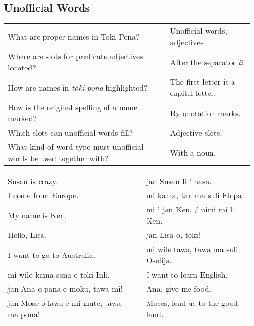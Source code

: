 \subsection*{Unofficial Words} 
\label{'unofficial_words'}
%
\begin{supertabular}{p{5,5cm}|ll}
What are proper names in Toki Pona? && Unofficial words, adjectives \\ %
Where are slots for predicate adjectives located? && After the separator \textit{li}. \\ %
How are names in \textit{toki pona} highlighted? && The first letter is a capital letter. \\ %
How is the original spelling of a name marked? && By quotation marks.  \\ %
Which slots can unofficial words fill? && Adjective slots.  \\ %
What kind of word type must unofficial words be used together with? && With a noun. \\ %
\end{supertabular}

\begin{supertabular}{p{5,5cm}|ll}
Susan is crazy.  && jan Susan li ' nasa. \\ %
I come from Europe. && mi kama, tan ma suli Elopa. \\ %
My name is Ken.  && mi ' jan Ken. / nimi mi li Ken. \\ %
Hello, Lisa.  && jan Lisa o, toki! \\ %
I want to go to Australia. && mi wile tawa, tawa ma suli Oselija. \\  %
mi wile kama sona e toki Inli.  && I want to learn English. \\
jan Ana o pana e moku, tawa mi!  && Ana, give me food. \\
jan Mose o lawa e mi mute, tawa ma pona!  && Moses, lead us to the good land. \\
\end{supertabular} 

